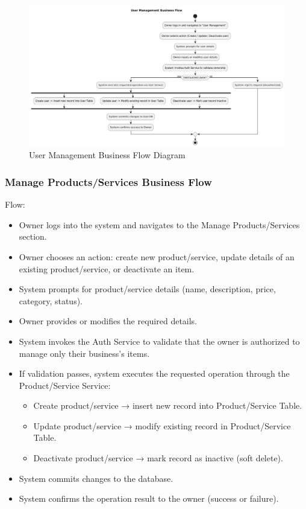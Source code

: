 \documentclass[]{VUMIFTemplateClass}
\begin{document}
\begin{figure}[H]
    \centering
    \includegraphics[width=1\textwidth]{images/diagrams/business/bpmn_user_manage.png}
    \caption{User Management Business Flow Diagram}
    \label{fig:user_manage_flow}
\end{figure}

\subsubsection{Manage Products/Services Business Flow}

Flow:
\begin{itemize}
\setlength{\itemsep}{2pt}
\setlength{\parskip}{0pt}
\setlength{\parsep}{0pt}
\item Owner logs into the system and navigates to the Manage Products/Services section.
\item Owner chooses an action: create new product/service, update details of an existing product/service, or deactivate an item.
\item System prompts for product/service details (name, description, price, category, status).
\item Owner provides or modifies the required details.
\item System invokes the Auth Service to validate that the owner is authorized to manage only their business’s items.
\item If validation passes, system executes the requested operation through the Product/Service Service:
\begin{itemize}
\item Create product/service → insert new record into Product/Service Table.
\item Update product/service → modify existing record in Product/Service Table.
\item Deactivate product/service → mark record as inactive (soft delete).
\end{itemize}
\item System commits changes to the database.
\item System confirms the operation result to the owner (success or failure).
\end{itemize}
\end{document}
